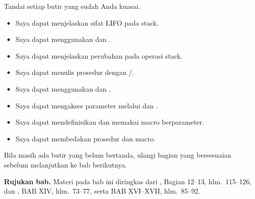 \begin{checklistbox}
\vspace{1.1em}
Tandai setiap butir yang sudah Anda kuasai.

\begin{itemize}
    \item[\checkbox] Saya dapat menjelaskan sifat LIFO pada stack.
    \item[\checkbox] Saya dapat menggunakan  dan
          .
    \item[\checkbox] Saya dapat menjelaskan perubahan  pada
          operasi stack.
    \item[\checkbox] Saya dapat menulis prosedur dengan
          /.
    \item[\checkbox] Saya dapat menggunakan  dan
          .
    \item[\checkbox] Saya dapat mengakses parameter melalui
           dan .
    \item[\checkbox] Saya dapat mendefinisikan dan memakai macro
          berparameter.
    \item[\checkbox] Saya dapat membedakan prosedur dan macro.
\end{itemize}

\vspace{0.4em}
Bila masih ada butir yang belum bertanda, ulangi bagian yang
bersesuaian sebelum melanjutkan ke bab berikutnya.
\end{checklistbox}

\begin{infobox}
\vspace{1.1em}
\textbf{Rujukan bab.} Materi pada bab ini diringkas dari
\cite{gunawan2019}, Bagian 12--13, hlm.~115--126, dan
\cite{sto2001}, BAB XIV, hlm.~73--77, serta BAB XVI--XVII,
hlm.~85--92.
\end{infobox}
